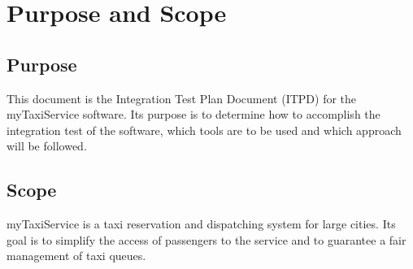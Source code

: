 \section{Purpose and Scope}
\label{sec:purpose}

\subsection{Purpose}
This document is the Integration Test Plan Document (ITPD) for the myTaxiService software.
Its purpose is to determine how to accomplish the integration test of the software, which tools are to be used and which approach will be followed.

\subsection{Scope}
myTaxiService is a taxi reservation and dispatching system for large cities. Its goal is to simplify the access of passengers to the service and to guarantee a fair management of taxi queues.
